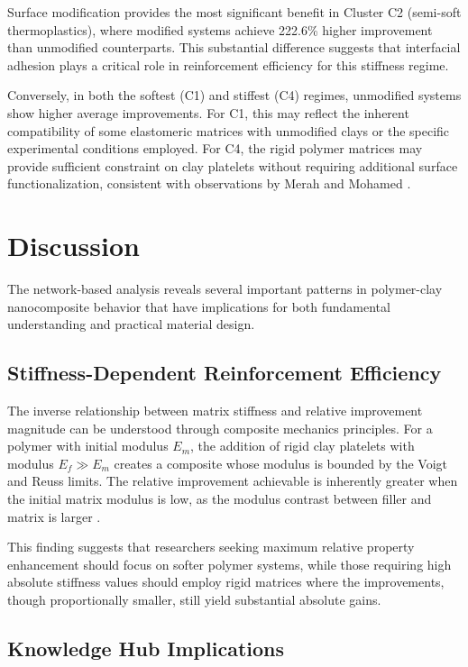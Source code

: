 \documentclass[conference]{IEEEtran}
\begin{document}
Surface modification provides the most significant benefit in Cluster C2 (semi-soft thermoplastics), where modified systems achieve 222.6\% higher improvement than unmodified counterparts. This substantial difference suggests that interfacial adhesion plays a critical role in reinforcement efficiency for this stiffness regime.

Conversely, in both the softest (C1) and stiffest (C4) regimes, unmodified systems show higher average improvements. For C1, this may reflect the inherent compatibility of some elastomeric matrices with unmodified clays or the specific experimental conditions employed. For C4, the rigid polymer matrices may provide sufficient constraint on clay platelets without requiring additional surface functionalization, consistent with observations by Merah and Mohamed \cite{merah2019nanoclay}.

\section{Discussion}

The network-based analysis reveals several important patterns in polymer-clay nanocomposite behavior that have implications for both fundamental understanding and practical material design.

\subsection{Stiffness-Dependent Reinforcement Efficiency}

The inverse relationship between matrix stiffness and relative improvement magnitude can be understood through composite mechanics principles. For a polymer with initial modulus $E_m$, the addition of rigid clay platelets with modulus $E_f \gg E_m$ creates a composite whose modulus is bounded by the Voigt and Reuss limits. The relative improvement achievable is inherently greater when the initial matrix modulus is low, as the modulus contrast between filler and matrix is larger \cite{heydari2016multiscale, zare2017efficiency}.

This finding suggests that researchers seeking maximum relative property enhancement should focus on softer polymer systems, while those requiring high absolute stiffness values should employ rigid matrices where the improvements, though proportionally smaller, still yield substantial absolute gains.

\subsection{Knowledge Hub Implications}
\end{document}
